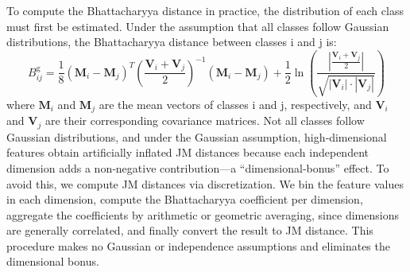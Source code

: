 \documentclass[runningheads]{llncs}
\begin{document}
To compute the Bhattacharyya distance in practice, the distribution of each class must first be estimated. Under the assumption that all classes follow Gaussian distributions, the Bhattacharyya distance between classes i and j is:
\begin{equation}
    B_{ij}^{\text{g}} = \frac{1}{8} (\mathbf{M}_i - \mathbf{M}_j)^T \left( \frac{\mathbf{V}_i + \mathbf{V}_j}{2} \right)^{-1} (\mathbf{M}_i - \mathbf{M}_j) + \frac{1}{2} \ln \left( \frac{ | \frac{\mathbf{V}_i + \mathbf{V}_j}{2} | }{ \sqrt{ | \mathbf{V}_i | \cdot | \mathbf{V}_j | } } \right)
\end{equation}
where $\mathbf{M}_i$ and $\mathbf{M}_j$ are the mean vectors of classes i and j, respectively, and $\mathbf{V}_i$ and $\mathbf{V}_j$ are their corresponding covariance matrices.
Not all classes follow Gaussian distributions, and under the Gaussian assumption, high‑dimensional features obtain artificially inflated JM distances because each independent dimension adds a non‑negative contribution—a “dimensional‑bonus” effect. To avoid this, we compute JM distances via discretization. We bin the feature values in each dimension, compute the Bhattacharyya coefficient per dimension, aggregate the coefficients by arithmetic or geometric averaging, since dimensions are generally correlated, and finally convert the result to JM distance. This procedure makes no Gaussian or independence assumptions and eliminates the dimensional bonus.
\end{document}
